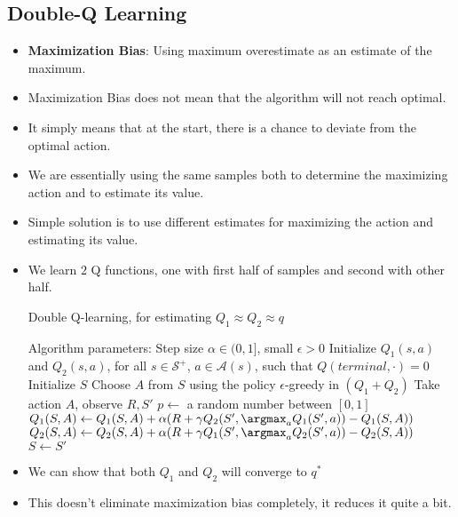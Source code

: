 \documentclass[a4paper]{article}
\begin{document}
\subsection{Double-Q Learning}
\begin{itemize}
    \item \textbf{Maximization Bias}: Using maximum overestimate as an estimate of the maximum.
    \item Maximization Bias does not mean that the algorithm will not reach optimal.
    \item It simply means that at the start, there is a chance to deviate from the optimal action.
    \item We are essentially using the same samples both to determine the maximizing action and to estimate its value.
    \item Simple solution is to use different estimates for maximizing the action and estimating its value.
    \item We learn $2$ Q functions, one with first half of samples and second with other half.
    \begin{algorithm}[H]
        \caption{Double Q-learning, for estimating $Q_1\approx Q_2\approx q$}\label{alg:Double-Q-Learning}
        \begin{algorithmic}[1]
            \Statex Algorithm parameters: Step size $\alpha \in (0,1]$, small $\epsilon>0$
            \Statex Initialize $Q_1(s,a)$ and $Q_2(s,a)$, for all $s\in \mathcal{S}^+$, $a\in \mathcal{A}(s)$, such that $Q(terminal,\cdot)=0$
            \Statex
                \State Initialize $S$
                \Repeat
                    \State Choose $A$ from $S$ using the policy $\epsilon$-greedy in $(Q_1+Q_2)$
                    \State Take action $A$, observe $R,S'$
                    \State $p\gets$ a random number between $[0,1]$
                        \State $Q_1(S,A)\gets Q_1(S,A)+\alpha(R+\gamma Q_2(S',\argmax_aQ_1(S',a))-Q_1(S,A))$
                    \Else
                        \State $Q_2(S,A)\gets Q_2(S,A)+\alpha(R+\gamma Q_1(S',\argmax_aQ_2(S',a))-Q_2(S,A))$
                    \EndIf
                    \State $S\gets S'$
            \EndFor
        \end{algorithmic}
    \end{algorithm}
    \item We can show that both $Q_1$ and $Q_2$ will converge to $q^*$
    \item This doesn't eliminate maximization bias completely, it reduces it quite a bit.
\end{itemize}
\end{document}
